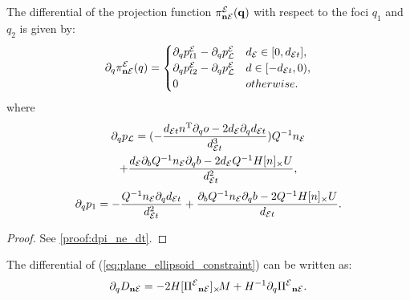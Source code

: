 \documentclass[10pt,twocolumn,twoside]{IEEEtran}
\begin{document}
  \begin{proposition}\label{prop:dpi_ne_dt}
    The differential of the projection function $\pi^{\mathcal{E}}_{\mathbf{n} \mathcal{E}}(\mathbf{q})$ with respect to the foci $q_1$ and $q_2$ is given by:
    \begin{equation}
      \partial_q \pi^{\mathcal{E}}_{\mathbf{n} \mathcal{E}}(q) = \begin{cases}
        \partial_q p^{\mathcal{E}}_{t1}-\partial_q p^{\mathcal{E}}_{\mathcal{L}} &  d_{\mathcal{E}} \in [0, d_{\mathcal{E} t}], \\
        \partial_q p^{\mathcal{E}}_{t2}-\partial_q p^{\mathcal{E}}_{\mathcal{L}} &  d \in [- d_{\mathcal{E} t},0), \\
        {0} & otherwise.
      \end{cases}
    \end{equation}
    where
    \begin{multline}
      \partial_q p_{\mathcal{L}} =   (-\frac{d_{\mathcal{E} t} n^\mathrm{T} \partial_q o -2d_{\mathcal{E}} \partial_q d_{\mathcal{E} t}}{d_{\mathcal{E} t}^3} )Q^{-1}n_{\mathcal{E}} \\
      + \frac{d_{\mathcal{E}}\partial_b Q^{-1} n_{\mathcal{E}} \partial_q b -  2d_{\mathcal{E}} Q^{-1}H[n]_\times U}{d_{\mathcal{E} t}^2},
    \end{multline}
    \begin{equation}
      \partial_q p_{1} =  -\frac{Q^{-1}n_{\mathcal{E}} \partial_q d_{\mathcal{E} t} }{d_{\mathcal{E} t}^2} 
      + \frac{\partial_b Q^{-1}n_{\mathcal{E}} \partial_q b -  2Q^{-1}H[n]_\times U }{d_{\mathcal{E} t}}.
    \end{equation}
  \end{proposition}
  \begin{proof}
  See \cref{proof:dpi_ne_dt}.
  \end{proof}
 The differential of (\ref{eq:plane_ellipsoid_constraint}) can be written as:
  \begin{equation}
    \partial_q {D_{\mathbf{n}\mathcal{E}}} = -2 H [{\Pi^{\mathcal{E}}}_{\mathbf{n} \mathcal{E}}]_{\times}\!  M + H^{-1}\partial_q {\Pi^{\mathcal{E}}}_{\mathbf{n} \mathcal{E}}.
  \end{equation}
\end{document}
